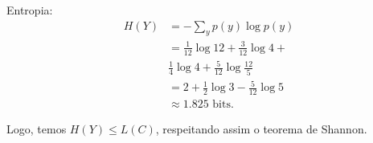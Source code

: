 \begin{questions}
\begin{solution}
\begin{parts}
\begin{minipage}[c]{0.35\textwidth}
   Entropia:
   \begin{align}
   H(Y) &= - \sum_y p(y) \log p(y) \nonumber \\ 
        &= \frac{1}{12} \log 12 + \frac{3}{12} \log 4 + \nonumber \\
         & \frac{1}{4} \log 4 + \frac{5}{12} \log \frac{12}{5} \nonumber \\
        &= 2 + \frac{1}{2} \log 3 - \frac{5}{12} \log 5 \nonumber \\
        &\approx 1.825 \text{ bits} .
   \end{align}

   Logo, temos $H(Y) \leq L(C)$, respeitando assim o teorema de Shannon.
\end{minipage}


\end{parts}
\end{solution}
\end{questions}
